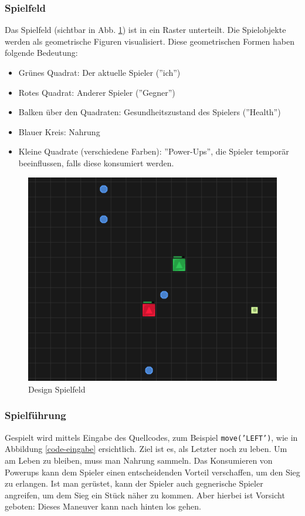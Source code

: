 \documentclass[11pt,a4paper,titlepage]{article}
\begin{document}
\subsubsection{Spielfeld}

Das Spielfeld (sichtbar in Abb. \ref{spielfeld}) ist in ein Raster unterteilt. Die Spielobjekte werden als geometrische Figuren visualisiert. Diese geometrischen Formen haben folgende Bedeutung:
\begin{itemize}
\item Grünes Quadrat: Der aktuelle Spieler (''ich'')
\item Rotes Quadrat: Anderer Spieler (''Gegner'')
\item Balken über den Quadraten: Gesundheitszustand des Spielers (''Health'')
\item Blauer Kreis: Nahrung
\item Kleine Quadrate (verschiedene Farben): ''Power-Ups'', die Spieler temporär beeinflussen, falls diese konsumiert werden.
\end{itemize}

\begin{figure}[H]
	\centering
	\includegraphics{game1.png}
	\caption{Design Spielfeld}
	\label{spielfeld}
\end{figure}

\subsubsection{Spielführung}

Gespielt wird mittels Eingabe des Quellcodes, zum Beispiel \texttt{move('LEFT')}, wie in Abbildung \ref{code-eingabe} ersichtlich. Ziel ist es, als Letzter noch zu leben. Um am Leben zu bleiben, muss man Nahrung sammeln. Das Konsumieren von Powerups kann dem Spieler einen entscheidenden Vorteil verschaffen, um den Sieg zu erlangen. Ist man gerüstet, kann der Spieler auch gegnerische Spieler angreifen, um dem Sieg ein Stück näher zu kommen. Aber hierbei ist Vorsicht geboten: Dieses Maneuver kann nach hinten los gehen.
\end{document}
